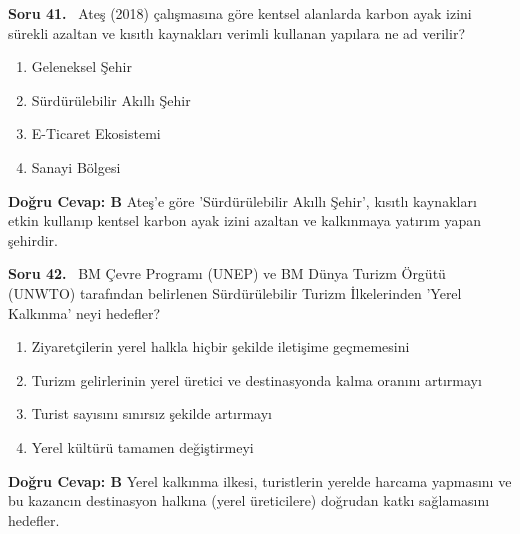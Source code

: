 \documentclass[11pt,a4paper,openany]{book}
\begin{document}
\needspace{5cm}
\vspace{8pt}
\noindent\textbf{\large\sffamily Soru 41.} \ Ateş (2018) çalışmasına göre kentsel alanlarda karbon ayak izini sürekli azaltan ve kısıtlı kaynakları verimli kullanan yapılara ne ad verilir?
\begin{enumerate}[label=\Alph*), leftmargin=25pt, topsep=4pt, itemsep=2pt]
    \item Geleneksel Şehir
    \item Sürdürülebilir Akıllı Şehir
    \item E-Ticaret Ekosistemi
    \item Sanayi Bölgesi
\end{enumerate}
\vspace{4pt}
\begin{tcolorbox}[title=Cevap ve Açıklama, colback=gray!3!white, colframe=primarycolor!90!black, arc=2mm, fonttitle=\bfseries\sffamily, top=6pt, bottom=6pt]
    \textbf{Doğru Cevap: B}
    \vspace{2pt}
    Ateş'e göre 'Sürdürülebilir Akıllı Şehir', kısıtlı kaynakları etkin kullanıp kentsel karbon ayak izini azaltan ve kalkınmaya yatırım yapan şehirdir.
\end{tcolorbox}
\vspace{10pt}

\needspace{5cm}
\vspace{8pt}
\noindent\textbf{\large\sffamily Soru 42.} \ BM Çevre Programı (UNEP) ve BM Dünya Turizm Örgütü (UNWTO) tarafından belirlenen Sürdürülebilir Turizm İlkelerinden 'Yerel Kalkınma' neyi hedefler?
\begin{enumerate}[label=\Alph*), leftmargin=25pt, topsep=4pt, itemsep=2pt]
    \item Ziyaretçilerin yerel halkla hiçbir şekilde iletişime geçmemesini
    \item Turizm gelirlerinin yerel üretici ve destinasyonda kalma oranını artırmayı
    \item Turist sayısını sınırsız şekilde artırmayı
    \item Yerel kültürü tamamen değiştirmeyi
\end{enumerate}
\vspace{4pt}
\begin{tcolorbox}[title=Cevap ve Açıklama, colback=gray!3!white, colframe=primarycolor!90!black, arc=2mm, fonttitle=\bfseries\sffamily, top=6pt, bottom=6pt]
    \textbf{Doğru Cevap: B}
    \vspace{2pt}
    Yerel kalkınma ilkesi, turistlerin yerelde harcama yapmasını ve bu kazancın destinasyon halkına (yerel üreticilere) doğrudan katkı sağlamasını hedefler.
\end{tcolorbox}
\vspace{10pt}
\end{document}
